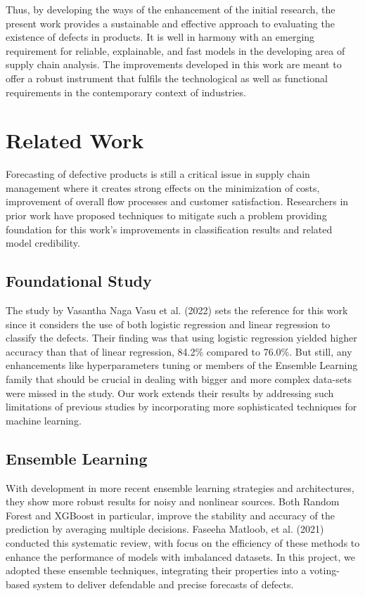 \documentclass[conference]{IEEEtran}
\begin{document}
Thus, by developing the ways of the enhancement of the initial research, the present work provides a sustainable and effective approach to evaluating the existence of defects in products. It is well in harmony with an emerging requirement for reliable, explainable, and fast models in the developing area of supply chain analysis. The improvements developed in this work are meant to offer a robust instrument that fulfils the technological as well as functional requirements in the contemporary context of industries.

\section{Related Work}
Forecasting of defective products is still a critical issue in supply chain management where it creates strong effects on the minimization of costs, improvement of overall flow processes and customer satisfaction. Researchers in prior work have proposed techniques to mitigate such a problem providing foundation for this work’s improvements in classification results and related model credibility.

\subsection{Foundational Study}
The study by Vasantha Naga Vasu et al. (2022) \cite{vasu2022prediction} sets the reference for this work since it considers the use of both logistic regression and linear regression to classify the defects. Their finding was that using logistic regression yielded higher accuracy than that of linear regression, 84.2\% compared to 76.0\%. But still, any enhancements like hyperparameters tuning or members of the Ensemble Learning family that should be crucial in dealing with bigger and more complex data-sets were missed in the study. Our work extends their results by addressing such limitations of previous studies by incorporating more sophisticated techniques for machine learning.

\subsection{Ensemble Learning}
With development in more recent ensemble learning strategies and architectures, they show more robust results for noisy and nonlinear sources. Both Random Forest and XGBoost in particular, improve the stability and accuracy of the prediction by averaging multiple decisions. Faseeha Matloob, et al. (2021) \cite{matloob2021software} conducted this systematic review, with focus on the efficiency of these methods to enhance the performance of models with imbalanced datasets. In this project, we adopted these ensemble techniques, integrating their properties into a voting-based system to deliver defendable and precise forecasts of defects.
\end{document}
